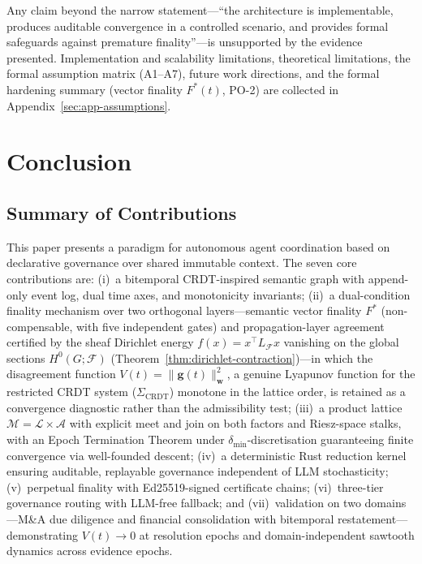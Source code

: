 \documentclass[11pt]{article}
\begin{document}
Any claim beyond the narrow statement---``the architecture is implementable, produces auditable convergence in a controlled scenario, and provides formal safeguards against premature finality''---is unsupported by the evidence presented. Implementation and scalability limitations, theoretical limitations, the formal assumption matrix (A1--A7), future work directions, and the formal hardening summary (vector finality $F^*(t)$, PO-2) are collected in Appendix~\ref{sec:app-assumptions}.

\section{Conclusion}

\subsection{Summary of Contributions}

This paper presents a paradigm for autonomous agent coordination based on declarative governance over shared immutable context. The seven core contributions are: (i)~a bitemporal CRDT-inspired semantic graph with append-only event log, dual time axes, and monotonicity invariants; (ii)~a dual-condition finality mechanism over two orthogonal layers---semantic vector finality $F^*$ (non-compensable, with five independent gates) and propagation-layer agreement certified by the sheaf Dirichlet energy $f(x) = x^\top L_{\mathcal{F}} x$ vanishing on the global sections $H^0(G;\mathcal{F})$ (Theorem~\ref{thm:dirichlet-contraction})---in which the disagreement function $V(t) = \|\mathbf{g}(t)\|^2_\mathbf{w}$, a genuine Lyapunov function for the restricted CRDT system ($\Sigma_{\mathrm{CRDT}}$) monotone in the lattice order, is retained as a convergence diagnostic rather than the admissibility test; (iii)~a product lattice $\mathcal{M} = \mathcal{L} \times \mathcal{A}$ with explicit meet and join on both factors and Riesz-space stalks, with an Epoch Termination Theorem under $\delta_{\min}$-discretisation guaranteeing finite convergence via well-founded descent; (iv)~a deterministic Rust reduction kernel ensuring auditable, replayable governance independent of LLM stochasticity; (v)~perpetual finality with Ed25519-signed certificate chains; (vi)~three-tier governance routing with LLM-free fallback; and (vii)~validation on two domains---M\&A due diligence and financial consolidation with bitemporal restatement---demonstrating $V(t) \to 0$ at resolution epochs and domain-independent sawtooth dynamics across evidence epochs.
\end{document}
